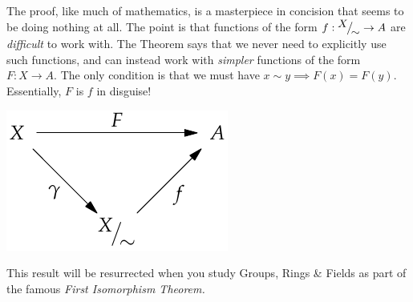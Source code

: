 \begin{minipage}[t]{0.65\linewidth}\vspace{0pt}
	The proof, like much of mathematics, is a masterpiece in concision that seems to be doing nothing at all. The point is that functions of the form $f:{}^{\textstyle {X}}\!\big/_{\textstyle \!{\sim}}\to A$ are \emph{difficult} to work with. The Theorem says that we never need to explicitly use such functions, and can instead work with \emph{simpler} functions of the form $F:X\to A$. The only condition is that we must have $x\sim y\implies F(x)=F(y)$. Essentially, $F$ is $f$ in disguise!
\end{minipage}
\hfill
\begin{minipage}[t]{0.3\linewidth}\vspace{0pt}
	\includegraphics[width=\textwidth]{relations-17-isomthm}
\end{minipage}\par

This result will be resurrected when you study Groups, Rings \& Fields as part of the famous \emph{First Isomorphism Theorem.}


% 



